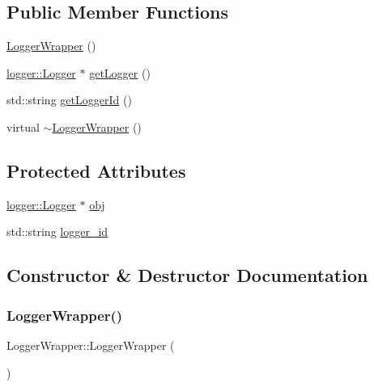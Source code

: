 \subsection*{Public Member Functions}
\begin{DoxyCompactItemize}
\item 
\mbox{\hyperlink{class_logger_wrapper_a59b61066a489cee482f318a78eafdf98}{Logger\+Wrapper}} ()
\item 
\mbox{\hyperlink{classlogger_1_1_logger}{logger\+::\+Logger}} $\ast$ \mbox{\hyperlink{class_logger_wrapper_afbd901f65ae9d2b11614c71265da41f1}{get\+Logger}} ()
\item 
std\+::string \mbox{\hyperlink{class_logger_wrapper_ad42b6f63cb509a7fa0d7e3aa82a95cb8}{get\+Logger\+Id}} ()
\item 
virtual \mbox{\hyperlink{class_logger_wrapper_ab56c41e4c4c07ea853aedf625e66e2b5}{$\sim$\+Logger\+Wrapper}} ()
\end{DoxyCompactItemize}
\subsection*{Protected Attributes}
\begin{DoxyCompactItemize}
\item 
\mbox{\hyperlink{classlogger_1_1_logger}{logger\+::\+Logger}} $\ast$ \mbox{\hyperlink{class_logger_wrapper_ad6ba450561dc58a6b83fb89c1a7efe97}{obj}}
\item 
std\+::string \mbox{\hyperlink{class_logger_wrapper_a8fd7e405de19e62a4627999e7b41ab07}{logger\+\_\+id}}
\end{DoxyCompactItemize}


\subsection{Constructor \& Destructor Documentation}
\mbox{\label{class_logger_wrapper_a59b61066a489cee482f318a78eafdf98}} 
\subsubsection{\texorpdfstring{Logger\+Wrapper()}{LoggerWrapper()}}
{\footnotesize\ttfamily Logger\+Wrapper\+::\+Logger\+Wrapper (\begin{DoxyParamCaption}{ }\end{DoxyParamCaption})\hspace{0.3cm}{\ttfamily [inline]}}

